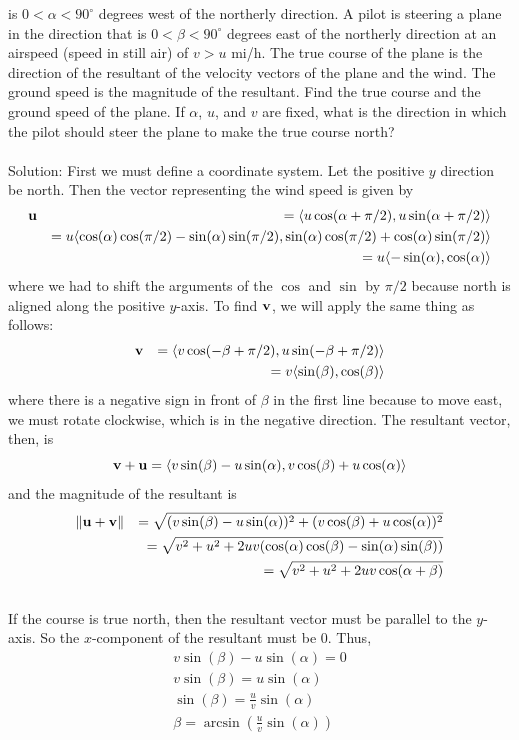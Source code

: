 \documentclass[12pt]{amsbook}
\newcommand{\la}{\langle}
\newcommand{\ra}{\rangle}
\begin{document}
is $0<\alpha<90^\circ$ degrees west of the northerly
direction.    
A pilot is steering a plane in the direction 
that is $0<\beta<90^\circ$ degrees east of the northerly
direction at an airspeed (speed in still air) of $v>u$ mi/h.
The true course of the plane is the direction of 
the resultant of the velocity vectors of the plane and the wind.
The ground speed is the magnitude of the resultant.
Find the true course and the ground speed of the plane.
If $\alpha$, $u$, and $v$ are fixed, what is the direction 
in which the pilot should steer the plane to make the 
true course north?\\ 
\\
{\sc Solution}:
First we must define a coordinate system. Let the positive $y$ direction be north. Then the vector representing the wind speed is given by 
\begin{eqnarray*}
{\bf u}&&= \la u\cos(\alpha + \pi/2),u\sin(\alpha + \pi/2) \ra \\
&&= u\la \cos(\alpha)\cos(\pi/2)-\sin(\alpha)\sin(\pi/2),\sin(\alpha)\cos(\pi/2)+\cos(\alpha)\sin(\pi/2) \ra \\
&&= u\la -\sin(\alpha),\cos(\alpha) \ra
\end{eqnarray*}
where we had to shift the arguments of the $\cos$ and $\sin$ by $\pi/2$ because north is aligned along the positive $y$-axis. To find $\bf v$, we will apply the same thing as follows:
\begin{eqnarray*}
{\bf v}&&= \la v\cos(-\beta + \pi/2),u\sin(-\beta + \pi/2) \ra \\
&&= v\la \sin(\beta),\cos(\beta) \ra
\end{eqnarray*}
where there is a negative sign in front of $\beta$ in the first line because to move east, we must rotate clockwise, which is in the negative direction. The resultant vector, then, is
$${\bf v+u}= \la v\sin(\beta)-u\sin(\alpha),v\cos(\beta)+u\cos(\alpha) \ra $$ 
and the magnitude of the resultant is
\begin{eqnarray*}
&\|{\bf u+v}\|&=\sqrt{(v\sin(\beta)-u\sin(\alpha))^2+(v\cos(\beta)+u\cos(\alpha))^2}\\
&&=\sqrt{v^2+u^2+2uv(\cos(\alpha)\cos(\beta)-\sin(\alpha)\sin(\beta))} \\
&&=\sqrt{v^2+u^2+2uv\cos(\alpha+\beta)}
\end{eqnarray*}
\\
If the course is true north, then the resultant vector must be parallel to the $y$-axis. So the $x$-component of the resultant must be $0$. Thus,
\begin{eqnarray*}
v\sin(\beta)-u\sin(\alpha)=0 \\
v\sin(\beta)=u\sin(\alpha) \\
\sin(\beta)= \frac uv \sin(\alpha) \\
\beta = \arcsin (\frac uv \sin(\alpha) )
\end{eqnarray*}
\end{document}
